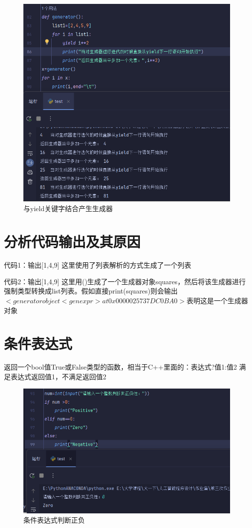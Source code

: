 \documentclass[10pt]{article}
\begin{document}
		\begin{figure}[H]
		\centering
		\includegraphics[scale=0.4]{生成器2}
		\caption{与yield关键字结合产生生成器}
	\end{figure}
\section{分析代码输出及其原因}	
	代码1：输出[1,4,9]  这里使用了列表解析的方式生成了一个列表\par
	代码2：输出[1,4,9]  这里用()生成了一个生成器对象squares，然后将该生成器进行强制类型转换成list列表。假如直接print(squares)则会输出$<generator object <genexpr> at 0x0000025737DC0BA0>$表明这是一个生成器对象
\section{条件表达式}
	返回一个bool值True或False类型的函数，相当于C++里面的：表达式?值1:值2 满足表达式返回值1，不满足返回值2
	\begin{figure}[H]
		\centering
		\includegraphics[scale=0.8]{正负}
		\caption{条件表达式判断正负}
	\end{figure}
\end{document}
